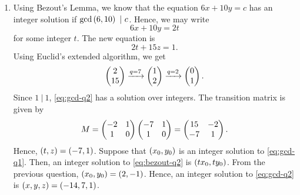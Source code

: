\documentclass[journal,12pt,onecolumn]{IEEEtran}
\begin{document}
\begin{enumerate}
    \item Using Bezout's Lemma, we know that the equation \(6x + 10y = c\) has
    an integer solution if \(\gcd\brak{6, 10}\ |\ c\). Hence, we may write 
    \begin{equation}
        6x + 10y = 2t
        \label{eq:bezout-q2}
    \end{equation}
    for some integer \(t\). The new equation is
    \begin{equation}
        2t + 15z = 1.
        \label{eq:gcd-q2}
    \end{equation}
    Using Euclid's extended algorithm, we get
    \begin{equation}
        \begin{pmatrix}2\\15\end{pmatrix} \xrightarrow{q=7} \begin{pmatrix}1\\2\end{pmatrix} \xrightarrow{q=2} \begin{pmatrix}0\\1\end{pmatrix}.
        \label{eq:euclid-q2}
    \end{equation}
    Since \(1\ |\ 1\), \eqref{eq:gcd-q2} has a solution over integers. The
    transition matrix is given by
    \begin{equation}
        M = \begin{pmatrix}-2 & 1 \\ 1 & 0\end{pmatrix}\begin{pmatrix}-7 & 1 \\ 1 & 0\end{pmatrix} 
        = \begin{pmatrix}15 & -2 \\ -7 & 1\end{pmatrix}.
        \label{eq:mtx-q2}
    \end{equation}
    Hence, \(\left(t, z\right) = \left(-7, 1\right)\). Suppose that \(\left(x_0, y_0\right)\) is
    an integer solution to \eqref{eq:gcd-q1}. Then, an integer solution to
    \eqref{eq:bezout-q2} is \(\left(tx_0, ty_0\right)\). From the previous question,
    \(\left(x_0, y_0\right) = \left(2, -1\right)\). Hence, an integer solution to
    \eqref{eq:gcd-q2} is \(\left(x, y, z\right) = \left(-14, 7, 1\right)\).


\end{enumerate}
\end{document}
